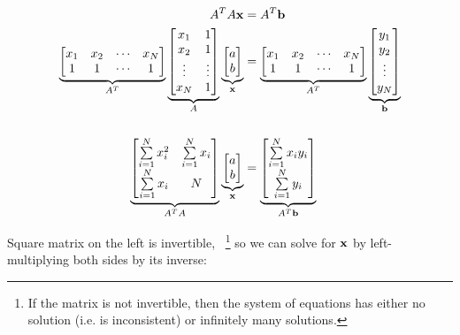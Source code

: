 \begin{problem}
\begin{enumroman}
\begin{answer}
        \begin{align*}
          A^T A \mathbf{x} &= A^T \mathbf{b} \\
          \underbrace{\begin{bmatrix}
            x_1 & x_2 & \cdots & x_N \\
            1 & 1 & \cdots & 1
          \end{bmatrix}}_{A^T}
          \underbrace{\begin{bmatrix}
            x_1 & 1 \\
            x_2 & 1 \\
            \vdots & \vdots \\
            x_N & 1
          \end{bmatrix}}_{A}
          \underbrace{\begin{bmatrix}
            a \\
            b
          \end{bmatrix}}_{\mathbf{x}}
          &=
          \underbrace{\begin{bmatrix}
            x_1 & x_2 & \cdots & x_N \\
            1 & 1 & \cdots & 1
          \end{bmatrix}}_{A^T}
          \underbrace{\begin{bmatrix}
            y_1 \\
            y_2 \\
            \vdots \\
            y_N
          \end{bmatrix}}_{\mathbf{b}} \\ \\
          \underbrace{\begin{bmatrix}
            \sum\limits_{i=1}^N x_i^2 & \sum\limits_{i=1}^N x_i \\
            \sum\limits_{i=1}^N x_i & N
          \end{bmatrix}}_{A^T A}
          \underbrace{\begin{bmatrix}
            a \\
            b
          \end{bmatrix}}_{\mathbf{x}}
          &=
          \underbrace{\begin{bmatrix}
            \sum\limits_{i=1}^N x_i y_i \\
            \sum\limits_{i=1}^N y_i
          \end{bmatrix}}_{A^T \mathbf{b}}
        \end{align*}

        Square matrix on the left is invertible,
        ~\footnote{
          If the matrix is not invertible, then the system of equations
          has either no solution (i.e. is inconsistent)
          or infinitely many solutions.
        }
        so we can solve for $\mathbf{x}$ by left-multiplying both sides
        by its inverse:


\end{answer}
\end{enumroman}
\end{problem}
